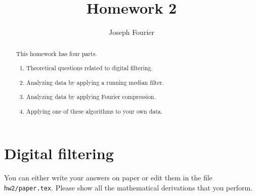 \author{Joseph Fourier}
\title{Homework 2}

\begin{abstract}
  This homework has four parts. 
  \begin{enumerate}
  \item Theoretical questions related to digital filtering.
  \item Analyzing data by applying a running median filter.
  \item Analyzing data by applying Fourier compression.
  \item Applying one of these algorithms to your own data.
  \end{enumerate}
\end{abstract}

\section{Digital filtering}

You can either write your answers on paper or edit them in the file
\verb#hw2/paper.tex#. Please show all the mathematical
derivations that you perform.

